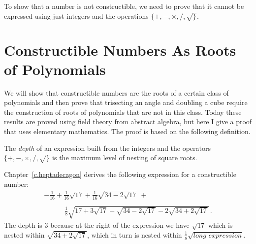 To show that a number is not constructible, we need to prove that it cannot be expressed using just integers and the operations $\{+,-,\times,/,\surd\}$.

\section{Constructible Numbers As Roots of Polynomials}\label{s.trisect-poly}

We will show that constructible numbers are the roots of a certain class of polynomials and then prove that trisecting an angle and doubling a cube require the construction of roots of polynomials that are not in this class. Today these results are proved using field theory from abstract algebra, but here I give a proof that uses elementary mathematics. The proof is based on the following definition.

\begin{definition}
The \emph{depth} of an expression built from the integers and the operators $\{+,-,\times,/,\surd\}$ is the maximum level of nesting of square roots.
\end{definition}

\begin{example}
Chapter~\ref{c.heptadecagon} derives the following expression for a constructible number:
\begin{displaymath}
\begin{array}{l}
-\displaystyle\frac{1}{16}+\frac{1}{16}\sqrt{17} + 
     \frac{1}{16}\sqrt{34-2\sqrt{17}}
   \: + \\
   \\
    \quad \quad \quad \displaystyle\frac{1}{8}\sqrt{
     17+3\sqrt{17} - 
     \sqrt{34-2\sqrt{17}}
   -2
     \sqrt{34+2\sqrt{17}}
   }\,.
\end{array}
\end{displaymath}
The depth is $3$ because at the right of the expression we have $\sqrt{17}$ which is nested within $\sqrt{34+2\sqrt{17}}$, which in turn is nested within $\frac{1}{8}\sqrt{\textit{long expression}}$.
\end{example}

